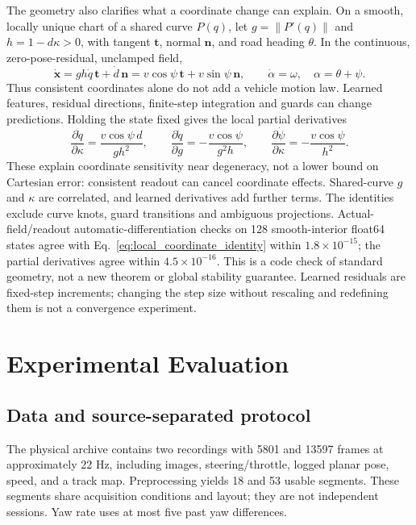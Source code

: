 \documentclass[preprint,12pt]{elsarticle}
\begin{document}
The geometry also clarifies what a coordinate change can explain. On a smooth,
locally unique chart of a shared curve $P(q)$, let $g=\|P'(q)\|$ and
$h=1-d\kappa>0$, with tangent $\mathbf t$, normal $\mathbf n$, and road
heading $\theta$. In the continuous, zero-pose-residual, unclamped field,
\begin{equation}
\dot{\mathbf x}=gh\dot q\,\mathbf t+\dot d\,\mathbf n
=v\cos\psi\,\mathbf t+v\sin\psi\,\mathbf n,
\qquad \dot\alpha=\omega,\quad \alpha=\theta+\psi.
\label{eq:local_coordinate_identity}
\end{equation}
Thus consistent coordinates alone do not add a vehicle motion law. Learned
features, residual directions, finite-step integration and guards can change
predictions. Holding the state fixed gives the local partial derivatives
\begin{equation}
\frac{\partial\dot q}{\partial\kappa}=\frac{v\cos\psi\,d}{gh^2},\qquad
\frac{\partial\dot q}{\partial g}=-\frac{v\cos\psi}{g^2h},\qquad
\frac{\partial\dot\psi}{\partial\kappa}=-\frac{v\cos\psi}{h^2}.
\label{eq:local_curvature_sensitivity}
\end{equation}
These explain coordinate sensitivity near degeneracy, not a lower bound on
Cartesian error: consistent readout can cancel coordinate effects. Shared-curve
$g$ and $\kappa$ are correlated, and learned derivatives add further terms.
The identities exclude curve knots, guard transitions and ambiguous projections.
Actual-field/readout automatic-differentiation checks on 128 smooth-interior
float64 states agree with Eq.~\ref{eq:local_coordinate_identity} within
$1.8\times10^{-15}$; the partial derivatives agree within $4.5\times10^{-16}$.
This is a code check of standard geometry, not a new theorem or global stability
guarantee. Learned residuals are fixed-step increments; changing the step size
without rescaling and redefining them is not a convergence experiment.

\section{Experimental Evaluation}\label{sec:experiments}\label{sec:setup}
\subsection{Data and source-separated protocol}
The physical archive contains two recordings with 5801 and 13597 frames at
approximately 22 Hz, including images, steering/throttle, logged planar pose,
speed, and a track map. Preprocessing yields 18 and 53 usable segments.
These segments share acquisition conditions and layout; they are not independent
sessions. Yaw rate uses at most five past yaw differences.
\end{document}

